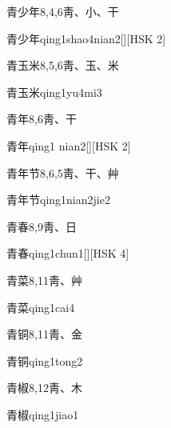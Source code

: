 \begin{entry}{青少年}{8,4,6}{⾭、⼩、⼲}
  \begin{phonetics}{青少年}{qing1shao4nian2}[][HSK 2]
  \end{phonetics}
\end{entry}

\begin{entry}{青玉米}{8,5,6}{⾭、⽟、⽶}
  \begin{phonetics}{青玉米}{qing1yu4mi3}
  \end{phonetics}
\end{entry}

\begin{entry}{青年}{8,6}{⾭、⼲}
  \begin{phonetics}{青年}{qing1 nian2}[][HSK 2]
  \end{phonetics}
\end{entry}

\begin{entry}{青年节}{8,6,5}{⾭、⼲、⾋}
  \begin{phonetics}{青年节}{qing1nian2jie2}
  \end{phonetics}
\end{entry}

\begin{entry}{青春}{8,9}{⾭、⽇}
  \begin{phonetics}{青春}{qing1chun1}[][HSK 4]
  \end{phonetics}
\end{entry}

\begin{entry}{青菜}{8,11}{⾭、⾋}
  \begin{phonetics}{青菜}{qing1cai4}
  \end{phonetics}
\end{entry}

\begin{entry}{青铜}{8,11}{⾭、⾦}
  \begin{phonetics}{青铜}{qing1tong2}
  \end{phonetics}
\end{entry}

\begin{entry}{青椒}{8,12}{⾭、⽊}
  \begin{phonetics}{青椒}{qing1jiao1}
  \end{phonetics}
\end{entry}

